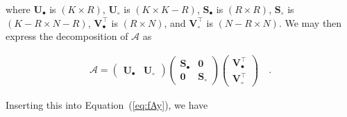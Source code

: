 \documentclass[modern,linenumbers]{aastex62}
\begin{document}
%
where
$\mathbf{U}_\bullet$ is $(K \times R)$,
$\mathbf{U}_\circ$ is $(K \times K - R)$,
$\mathbf{S}_\bullet$ is $(R \times R)$,
$\mathbf{S}_\circ$ is $(K - R \times N - R)$,
$\mathbf{V}_\bullet^\top$ is $(R \times N)$,
and
$\mathbf{V}_\circ^\top$ is $(N - R \times N)$.
%
We may then express the decomposition of $\pmb{\mathcal{A}}$ as
%
\begin{linenomath}\begin{align}
        \label{eq:A}
        \pmb{\mathcal{A}} =
        \left(
        \begin{array}{c|c}
                \mathbf{U}_\bullet & \mathbf{U}_\circ
            \end{array}
        \right)
        \left(
        \begin{array}{c|c}
                \mathbf{S}_\bullet & \mathbf{0}       \\
                \hline
                \mathbf{0}         & \mathbf{S}_\circ
            \end{array}
        \right)
        \left(
        \begin{array}{cc}
                \mathbf{V}_\bullet^\top \\
                \hline
                \mathbf{V}_\circ^\top
            \end{array}
        \right)
        \quad.
    \end{align}\end{linenomath}
%
Inserting this into Equation~(\ref{eq:fAy}), we have
%
\end{document}

